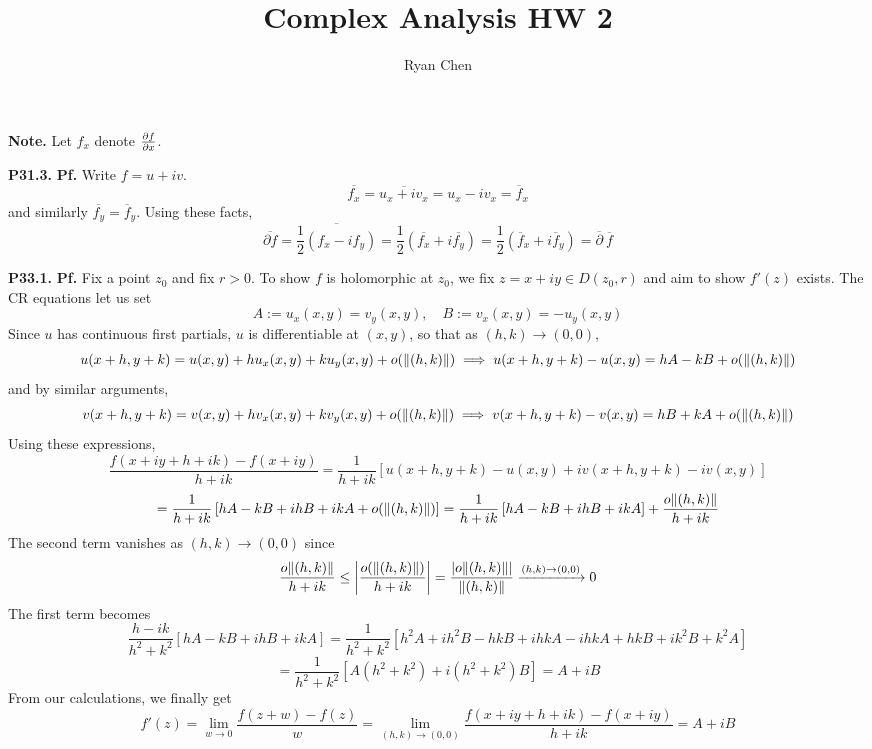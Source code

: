 \documentclass{article}
\title{Complex Analysis HW 2}
\author{Ryan Chen}
\date{}
\def\tbf#1{\textbf{#1}}
\newcommand{\sbr}[1]{\left[#1\right]}
\newcommand{\pf}{\tbf{Pf. }}
\newcommand{\imp}{\implies}
\newcommand{\sep}[1][.5cm]{\vspace{#1}}
\renewcommand{\bar}{\overline}
\begin{document}
	
\maketitle



\tbf{Note.} Let $f_x$ denote $\pdv{f}{x}$.
\sep



\tbf{P31.3.} \pf Write $f=u+iv$.
$$\bar{f_x} = \bar{u_x+iv_x} = u_x-iv_x = \bar f_x$$
and similarly $\bar{f_y}=\bar f_y$. Using these facts,
$$\bar{\partial f} = \bar{\frac12(f_x-if_y)} = \frac12(\bar{f_x}+i\bar{f_y}) = \frac12(\bar f_x+i\bar f_y) = \bar\partial~\bar f$$
\sep



\tbf{P33.1.} \pf Fix a point $z_0$ and fix $r>0$. To show $f$ is holomorphic at $z_0$, we fix $z=x+iy\in D(z_0,r)$ and aim to show $f'(z)$ exists. The CR equations let us set
$$A := u_x(x,y) = v_y(x,y),
\quad B := v_x(x,y) = -u_y(x,y)$$
Since $u$ has continuous first partials, $u$ is differentiable at $(x,y)$, so that as $(h,k)\to(0,0)$,
$$u(x+h,y+k) = u(x,y) + hu_x(x,y) + ku_y(x,y) + o(\norm{(h,k)})
\imp u(x+h,y+k) - u(x,y) =  hA - kB + o(\norm{(h,k)})$$
and by similar arguments,
$$v(x+h,y+k) = v(x,y) + hv_x(x,y) + kv_y(x,y) + o(\norm{(h,k)})
\imp v(x+h,y+k) - v(x,y) = hB + kA + o(\norm{(h,k)})$$
Using these expressions,
$$\frac{f(x+iy+h+ik) - f(x+iy)}{h+ik}
= \frac{1}{h+ik}\sbr{u(x+h,y+k) - u(x,y) + iv(x+h,y+k) - iv(x,y)}$$
$$= \frac{1}{h+ik}\sbr{hA - kB + ihB + ikA + o(\norm{(h,k)})}
= \frac{1}{h+ik}\sbr{hA - kB + ihB + ikA} + \frac{o{\norm{(h,k)}}}{h+ik}$$
The second term vanishes as $(h,k)\to(0,0)$ since
$$\frac{o{\norm{(h,k)}}}{h+ik} \le \abs{\frac{o(\norm{(h,k)})}{h+ik}}
= \frac{\abs{o{\norm{(h,k)}}}}{\norm{(h,k)}}
\app[(h,k)][(0,0)] 0$$
The first term becomes
$$\frac{h-ik}{h^2+k^2}\sbr{hA - kB + ihB + ikA}
= \frac{1}{h^2+k^2}\sbr{h^2A + ih^2B - hkB + ihkA - ihkA + hkB + ik^2B + k^2A}$$
$$= \frac{1}{h^2+k^2}\sbr{A(h^2+k^2) + i(h^2+k^2)B}
= A + iB$$
From our calculations, we finally get
$$f'(z) = \lim_{w\to0}\frac{f(z+w)-f(z)}{w}
= \lim_{(h,k)\to(0,0)}\frac{f(x+iy+h+ik) - f(x+iy)}{h+ik}
= A + iB$$
\sep
\end{document}

